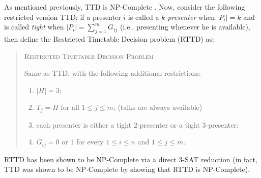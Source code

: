 \documentclass[]{article}
\theoremstyle{definition}
\theoremstyle{remark}
\numberwithin{equation}{section}
\begin{document}
As mentioned previously, TTD is NP-Complete \cite{even76}. Now, consider the following restricted version TTD; if a presenter $i$ is called a $k$\textit{-presenter} when $|P_i|=k$ and is called \textit{tight} when $|P_i|=\sum\limits_{j=1}^{m} G_{ij}$ (i.e., presenting whenever he is available), then define the Restricted Timetable Decision problem (RTTD) as:
\begin{quote}
	\textsc{Restricted Timetable Decision Problem}
	
	Same as TTD, with the following additional restrictions:
	\begin{enumerate}
		\item $|H|=3$;
		\item $T_j = H$ for all $1 \le j \le m$; (talks are always available)
		\item each presenter is either a tight 2-presenter or a tight 3-presenter;
		\item $G_{ij}=0$ or $1$ for every $1 \le i \le n$ and $1 \le j \le m$.
	\end{enumerate}
\end{quote}
RTTD has been shown to be NP-Complete via a direct 3-SAT reduction \cite{even76} (in fact, TTD was shown to be NP-Complete by showing that RTTD is NP-Complete).
\end{document}
